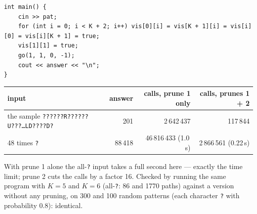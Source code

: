 \begin{solutionbox}
\begin{lstlisting}[style=cpp]
int main() {
    cin >> pat;
    for (int i = 0; i < K + 2; i++) vis[0][i] = vis[K + 1][i] = vis[i][0] = vis[i][K + 1] = true;
    vis[1][1] = true;
    go(1, 1, 0, -1);
    cout << answer << "\n";
}
\end{lstlisting}
\begin{center}
\small
\renewcommand{\arraystretch}{1.2}
\begin{tabular}{@{}lrrr@{}}
\toprule
\textbf{input} & \textbf{answer} & \textbf{calls, prune 1 only} & \textbf{calls, prunes 1 + 2} \\
\midrule
the sample \texttt{??????R??????U???\dots LD????D?} & 201 & 2\,642\,437 & 117\,844 \\
48 times \texttt{?} & 88\,418 & 46\,816\,433 (1.0\,s) & 2\,866\,561 (0.22\,s) \\
\bottomrule
\end{tabular}
\end{center}
With prune 1 alone the all-\texttt{?} input takes a full second here --- exactly the time limit; prune 2 cuts the calls by a factor 16. Checked by running the same program with $K = 5$ and $K = 6$ (all-\texttt{?}: 86 and 1770 paths) against a version without any pruning, on 300 and 100 random patterns (each character \texttt{?} with probability 0.8): identical.
\end{solutionbox}
